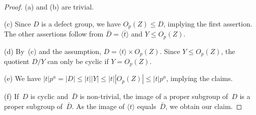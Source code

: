 \documentclass[10pt,a4paper]{amsart}
\begin{document}
\begin{proof}
(a) and (b) are trivial.

(c) Since $D$ is a defect group, we have $O_p( Z ) \leq D$, implying the first 
assertion. The other assertions follow
from $\bar{D} = \langle \bar{t} \rangle$ and $Y \leq O_p(Z)$.

(d) By~(c) and the assumption, $D = \langle t \rangle \times O_p( Z )$. Since 
$Y \leq O_p( Z )$, the quotient $D/Y$ can only be cyclic if $Y = O_p( Z )$.

(e) We have $|t|p^a = |D| \leq |t||Y| \leq |t||O_p(Z)| \leq |t|p^a$, implying
the claims.

(f) If~$D$ is cyclic and~$\bar{D}$ is non-trivial, the image of a proper subgroup 
of~$D$ is a proper subgroup of~$\bar{D}$. As the image of $\langle t \rangle$
equals~$\bar{D}$, we obtain our claim.
\end{proof}
\end{document}
